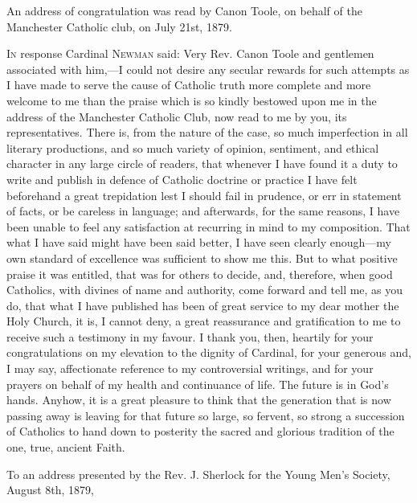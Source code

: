 
An address of congratulation was read by Canon
Toole, on behalf of the Manchester Catholic club, on July 21st, 1879.

I\textsc{n} response Cardinal N\textsc{ewman}
said: Very Rev. Canon Toole and gentlemen associated with him,—I
could not desire any secular rewards for such attempts as I have made
to serve the cause of Catholic truth more complete and more welcome to
me than the praise which is so kindly bestowed upon me in the address
of the Manchester Catholic Club, now read to me by you, its
representatives. There is, from the nature of the case, so much
imperfection in all literary productions, and so much variety of
opinion, sentiment, and ethical character in any large circle of
readers, that whenever I have found it a duty to write and publish in
defence of Catholic doctrine or practice I have felt beforehand a
great trepidation lest I should fail in prudence, or err in statement
of facts, or be careless in language; and afterwards, for the same
reasons, I have been unable to feel any satisfaction at recurring in
mind to my composition. That what I have said might have been said
better, I have seen clearly enough—my own standard of excellence was
sufficient to show me this. But to what positive praise it was
entitled, that was for others to decide, and, therefore, when good
Catholics, with divines of name and authority, come forward and tell
me, as you do, that what I have published has been of great service to
my dear mother the Holy Church, it is, I cannot deny, a great
reassurance and gratification to me to receive such a testimony in my
favour. I thank you, then, heartily for your congratulations on my
elevation to the dignity of Cardinal, for your generous and, I may
say, affectionate reference to my controversial writings, and for your
prayers on behalf of my health and continuance of life. The future is
in God's hands. Anyhow, it is a great pleasure to think that the
generation that is now passing away is leaving for that future so
large, so fervent, so strong a succession of Catholics to hand down to
posterity the sacred and glorious tradition of the one, true, ancient
Faith.


To an address presented by the Rev. J. Sherlock
for the Young Men's Society, August 8th, 1879,

